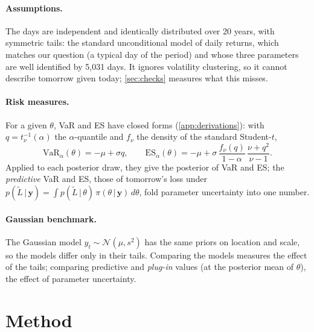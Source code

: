 \documentclass[12pt]{article}
\newcommand{\by}{\mathbf{y}}
\newcommand{\given}{\,\vert\,}
\newcommand{\VaR}{\mathrm{VaR}}
\newcommand{\ES}{\mathrm{ES}}
\begin{document}
\paragraph{Assumptions.} The days are independent and identically distributed over 20 years, with symmetric tails: the standard unconditional model of daily returns, which matches our question (a typical day of the period) and whose three parameters are well identified by 5,031 days. It ignores volatility clustering, so it cannot describe tomorrow given today; \cref{sec:checks} measures what this misses.

\paragraph{Risk measures.} For a given $\theta$, VaR and ES have closed forms (\cref{app:derivations}): with $q = t_\nu^{-1}(\alpha)$ the $\alpha$-quantile and $f_\nu$ the density of the standard Student-$t$,
\begin{equation}\label{eq:var-es}
  \VaR_\alpha(\theta) = -\mu + \sigma q, \qquad
  \ES_\alpha(\theta) = -\mu + \sigma\,\frac{f_\nu(q)}{1-\alpha}\,\frac{\nu+q^2}{\nu-1}.
\end{equation}
Applied to each posterior draw, they give the posterior of VaR and ES; the \emph{predictive} VaR and ES, those of tomorrow's loss under $p(\tilde L\given\by) = \int p(\tilde L\given\theta)\,\pi(\theta\given\by)\,d\theta$, fold parameter uncertainty into one number.

\paragraph{Gaussian benchmark.} The Gaussian model $y_t \sim \mathcal N(\mu, s^2)$ has the same priors on location and scale, so the models differ only in their tails. Comparing the models measures the effect of the tails; comparing predictive and \emph{plug-in} values (at the posterior mean of $\theta$), the effect of parameter uncertainty.

\section{Method}\label{sec:method}
\end{document}
